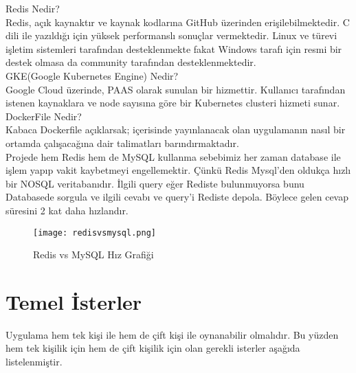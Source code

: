 \documentclass[conference]{IEEEtran}
\begin{document}
Redis Nedir?\\
Redis, açık kaynaktır ve kaynak kodlarına GitHub üzerinden erişilebilmektedir. C dili ile yazıldığı için yüksek performanslı sonuçlar vermektedir. Linux ve türevi işletim sistemleri tarafından desteklenmekte fakat Windows tarafı için resmi bir destek olmasa da community tarafından desteklenmektedir.\\

GKE(Google Kubernetes Engine) Nedir?\\
Google Cloud üzerinde, PAAS olarak sunulan bir hizmettir. Kullanıcı tarafından istenen kaynaklara ve node sayısına göre bir Kubernetes clusteri hizmeti sunar.\\

DockerFile Nedir?\\
Kabaca Dockerfile açıklarsak; içerisinde yayınlanacak olan uygulamanın nasıl bir ortamda çalışacağına dair talimatları barındırmaktadır. \\

Projede hem Redis hem de MySQL kullanma sebebimiz her zaman database ile işlem yapıp vakit kaybetmeyi engellemektir. Çünkü Redis Mysql'den oldukça hızlı bir NOSQL veritabanıdır. İlgili query eğer Rediste bulunmuyorsa bunu Databasede sorgula ve ilgili cevabı ve query'i Rediste depola. Böylece gelen cevap süresini 2 kat daha hızlandır.


\begin{figure}[ht] 
    \centering
    \texttt{[image: redisvsmysql.png]}
    \caption{Redis vs MySQL Hız Grafiği}
    \label{fig:spark}
\end{figure}



\section{Temel İsterler}

Uygulama hem tek kişi ile hem de çift kişi ile oynanabilir olmalıdır. Bu yüzden hem tek kişilik için hem de çift kişilik için olan gerekli isterler aşağıda listelenmiştir.\\
\end{document}
